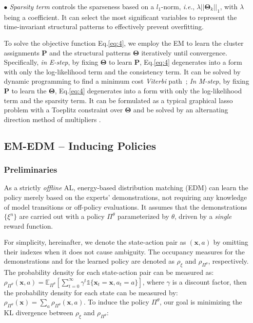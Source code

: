 \documentclass{article}
\begin{document}
\noindent $\bullet$ \textit{Sparsity term} controls the sparseness based on a \textit{$l_{1}$}-norm, \textit{i.e.}, $\lambda || \mathbf{\Theta}_{k}||_{1}$, with $\lambda$ being a coefficient. It can select the most significant variables to represent the time-invariant structural patterns to effectively prevent overfitting. 


To solve the objective function Eq.\eqref{eq:4}, we employ the EM to learn the cluster assignments $\mathbf{P}$ and the structural patterns $\mathbf{\Theta}$ iteratively until convergence. Specifically, \textit{in E-step}, by fixing $\mathbf{\Theta}$ to learn $\mathbf{P}$, Eq.\eqref{eq:4} degenerates into a form with only the log-likelihood term and the consistency term. It can be solved by dynamic programming to find a minimum cost \textit{Viterbi} path~\cite{viterbi1967error}; 
\textit{In M-step}, by fixing $\mathbf{P}$ to learn the $\mathbf{\Theta}$, Eq.\eqref{eq:4} degenerates into a form with only the log-likelihood term and the sparsity term. It can be formulated as a typical graphical lasso problem \cite{friedman2008sparse} with a Toeplitz constraint over $\mathbf{\Theta}$ and be solved by an alternating direction method of multipliers \cite{boyd2011distributed}. 


\subsection{EM-EDM -- Inducing Policies}

\subsubsection{Preliminaries}

As a strictly \emph{offline} AL, energy-based distribution matching (EDM) \cite{jarrett2020strictly} can learn the policy merely based on the experts' demonstrations, not requiring any knowledge of model transitions or off-policy evaluations. It assumes that the demonstrations $\{\xi^{n}\}$ are carried out with a policy $\Pi^{\theta}$ parameterized by $\theta$, driven by a \emph{single} reward function. 


For simplicity, hereinafter, we denote the state-action pair as $(\mathbf{x}, a)$ by omitting their indexes when it does not cause ambiguity. 
The occupancy measures for the demonstrations and for the learned policy are denoted as $\rho_{\xi}$ and $\rho_{\Pi^{\theta}}$, respectively. 
The probability density for each state-action pair can be measured as:  $\rho_{\Pi^{\theta}}(\mathbf{x},a) =  \mathbb{E}_{\Pi^{\theta}}[\sum_{t=0}^{\infty} \gamma^{t} \mathds{1}{\{\mathbf{x}_{t}=\mathbf{x}, a_{t}=a\}}]$, where $\gamma$ is a discount factor, then the probability density for each state can be measured by: $\rho_{\Pi^{\theta}}(\mathbf{x}) = \sum_{a} \rho_{\Pi^{\theta}}(\mathbf{x},a)$. To induce the policy $\Pi^{\theta}$, our goal is minimizing the KL divergence between $\rho_{\xi}$ and $\rho_{\Pi^{\theta}}$: 
\end{document}
